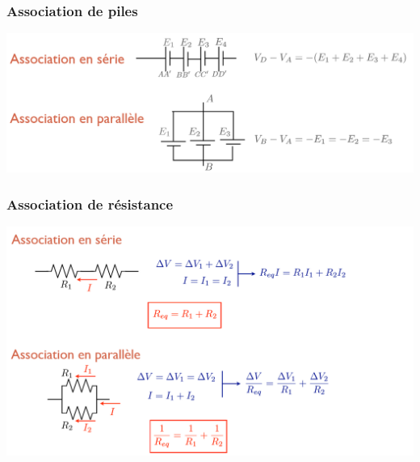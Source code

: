 \documentclass[a4paper]{article}
\begin{document}
\subsubsection{Association de piles}





\begin{center}

\includegraphics[width=\textwidth]{AssosPiles.PNG}

\end{center}






\subsubsection{Association de résistance}





\begin{center}

\includegraphics[width=\textwidth]{AssosResist.PNG}

\end{center}
\end{document}
